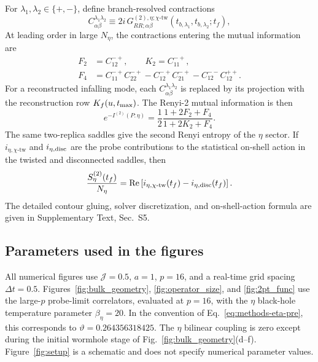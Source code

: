 \documentclass[pdflatex,sn-nature]{sn-jnl}
\begin{document}
For \(\lambda_1,\lambda_2\in\{+,-\}\), define branch-resolved contractions
\begin{equation}
C_{\alpha\beta}^{\lambda_1\lambda_2}
\equiv
2i\,
G^{(2),\eta;\chi\text{-tw}}_{RR;\alpha\beta}
(t_{b,\lambda_1},t_{b,\lambda_2};t_f),
\label{eq:methods-branch-contractions}
\end{equation}
At leading order in large \(N_\eta\), the contractions entering the mutual information are
\begin{equation}
\begin{aligned}
F_2&=C_{12}^{-+},\qquad
K_2=C_{11}^{-+},\\
F_4&=
C_{11}^{-+}C_{22}^{-+}
-C_{12}^{-+}C_{21}^{-+}
-C_{12}^{--}C_{12}^{++}.
\end{aligned}
\label{eq:methods-F-contractions}
\end{equation}
For a reconstructed infalling mode, each \(C_{\alpha\beta}^{\lambda_1\lambda_2}\) is replaced by its projection with the reconstruction row \(K_f(u,t_{\rm max})\). The Renyi-2 mutual information is then
\begin{equation}
e^{-I^{(2)}(P:\eta)}
=
\frac{1}{2}
\frac{1+2F_2+F_4}{1+2K_2+F_4}.
\label{eq:methods-MI-ratio}
\end{equation}
The same two-replica saddles give the second Renyi entropy of the \(\eta\) sector. If \(i_{\eta,\chi\text{-tw}}\) and \(i_{\eta,\rm disc}\) are the probe contributions to the statistical on-shell action in the twisted and disconnected saddles, then
\begin{equation}
\frac{S_\eta^{(2)}(t_f)}{N_\eta}
=
\operatorname{Re}\left[
i_{\eta,\chi\text{-tw}}(t_f)
-i_{\eta,\rm disc}(t_f)
\right].
\label{eq:methods-entropy-normalization}
\end{equation}
The detailed contour gluing, solver discretization, and on-shell-action formula are given in Supplementary Text, Sec.~S5.

\subsection{Parameters used in the figures}
\label{sec:methods-figure-parameters}

All numerical figures use \(\mathcal J=0.5\), \(a=1\), \(p=16\), and a real-time grid spacing \(\Delta t=0.5\). Figures~\ref{fig:bulk_geometry}, \ref{fig:operator_size}, and \ref{fig:2pt_func} use the large-\(p\) probe-limit correlators, evaluated at \(p=16\), with the \(\eta\) black-hole temperature parameter \(\beta_\eta=20\). In the convention of Eq.~\eqref{eq:methods-eta-pre}, this corresponds to \(\vartheta=0.264356318425\). The \(\eta\) bilinear coupling is zero except during the initial wormhole stage of Fig.~\ref{fig:bulk_geometry}(d--f). Figure~\ref{fig:setup} is a schematic and does not specify numerical parameter values.
\end{document}
